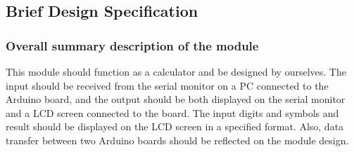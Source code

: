 \subsection{Brief Design Specification}
\subsubsection{Overall summary description of the module}
This module should function as a calculator and be designed by ourselves. The input should be received from the serial monitor on a PC connected to the Arduino board, and the output should be both displayed on the serial monitor and a LCD screen connected to the board. The input digits and symbols and result should be displayed on the LCD screen in a specified format. Also, data transfer between two Arduino boards should be reflected on the module design.
